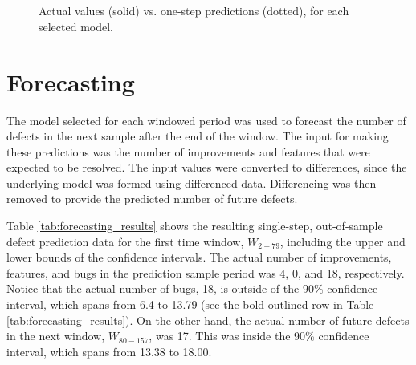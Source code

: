 \documentclass[letterpaper]{report}
\begin{document}
\begin{figure}[htbp]
\centering
{}\\
\\
%
\caption[One-step predictions]{Actual values (solid) vs. one-step predictions (dotted), for each selected model.}
\label{fig:one_step_predictions}
\end{figure}


\section*{Forecasting}

The model selected for each windowed period was used to forecast the number of defects in the next sample after the end of the window. The input for making these predictions was the number of improvements and features that were expected to be resolved. The input values were converted to differences, since the underlying model was formed using differenced data. Differencing was then removed to provide the predicted number of future defects.

Table \ref{tab:forecasting_results} shows the resulting single-step, out-of-sample defect prediction data for the first time window, $W_{2-79}$, including the upper and lower bounds of the confidence intervals. The actual number of improvements, features, and bugs in the prediction sample period was 4, 0, and 18, respectively. Notice that the actual number of bugs, 18, is outside of the 90\% confidence interval, which spans from 6.4 to 13.79 (see the bold outlined row in Table \ref{tab:forecasting_results}). On the other hand, the actual number of future defects in the next window, $W_{80−157}$, was 17. This was inside the 90\% confidence interval, which spans from 13.38 to 18.00.
\end{document}
